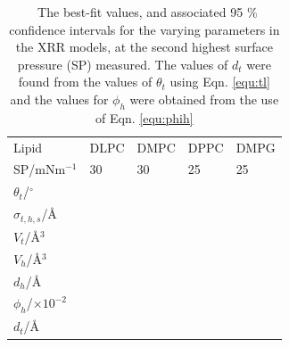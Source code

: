 \documentclass[11pt,a4paper]{paper}
\begin{document}
\begin{table}
  \centering
	\caption{\ The best-fit values, and associated 95 \% confidence intervals for the varying parameters in the XRR models, at the second highest surface pressure (SP) measured. The values of $d_t$ were found from the values of $\theta_t$ using Eqn. \ref{equ:tl} and the values for $\phi_h$ were obtained from the use of Eqn. \ref{equ:phih}}
	\label{tab:liptab1}
	\begin{tabular}{l|l|l|l|l}
		Lipid & DLPC & DMPC & DPPC & DMPG \\
    SP/mNm$^{-1}$ & 30 & 30 & 25 & 25 \\
		\hline
		$\theta_t$/$^\circ$ &  &  &  &  \\
		$\sigma_{t,h,s}$/\AA &  &  &  &  \\
    \hline
    $V_t$/\AA$^3$ &  &  &  &  \\
		$V_h$/\AA$^3$ &  &  &  &  \\
		$d_h$/\AA &  &  &  &  \\
    \hline
    $\phi_h$/$\times10^{-2}$ &  &  &  &  \\
		$d_t$/\AA &  &  &  &  \\
	\end{tabular}
\end{table}
%
%
\end{document}
